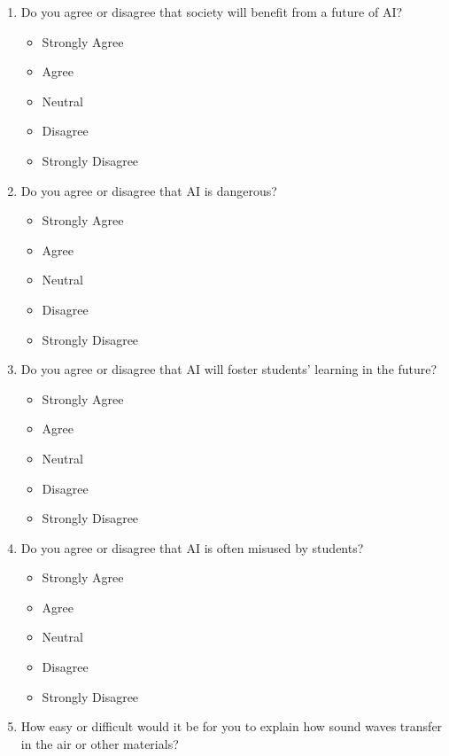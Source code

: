 \documentclass[
  12pt,
]{article}
\providecommand{\tightlist}{%
  \setlength{\itemsep}{0pt}\setlength{\parskip}{0pt}}
\begin{document}
\begin{enumerate}
\def\labelenumi{\arabic{enumi}.}
\item
  Do you agree or disagree that society will benefit from a future of AI?

  \begin{itemize}
  \tightlist
  \item
    Strongly Agree
  \item
    Agree
  \item
    Neutral
  \item
    Disagree
  \item
    Strongly Disagree
  \end{itemize}
\item
  Do you agree or disagree that AI is dangerous?

  \begin{itemize}
  \tightlist
  \item
    Strongly Agree
  \item
    Agree
  \item
    Neutral
  \item
    Disagree
  \item
    Strongly Disagree
  \end{itemize}
\item
  Do you agree or disagree that AI will foster students' learning in the future?

  \begin{itemize}
  \tightlist
  \item
    Strongly Agree
  \item
    Agree
  \item
    Neutral
  \item
    Disagree
  \item
    Strongly Disagree
  \end{itemize}
\item
  Do you agree or disagree that AI is often misused by students?

  \begin{itemize}
  \tightlist
  \item
    Strongly Agree
  \item
    Agree
  \item
    Neutral
  \item
    Disagree
  \item
    Strongly Disagree
  \end{itemize}
\item
  How easy or difficult would it be for you to explain how sound waves transfer in the air or other materials?


\end{enumerate}
\end{document}
